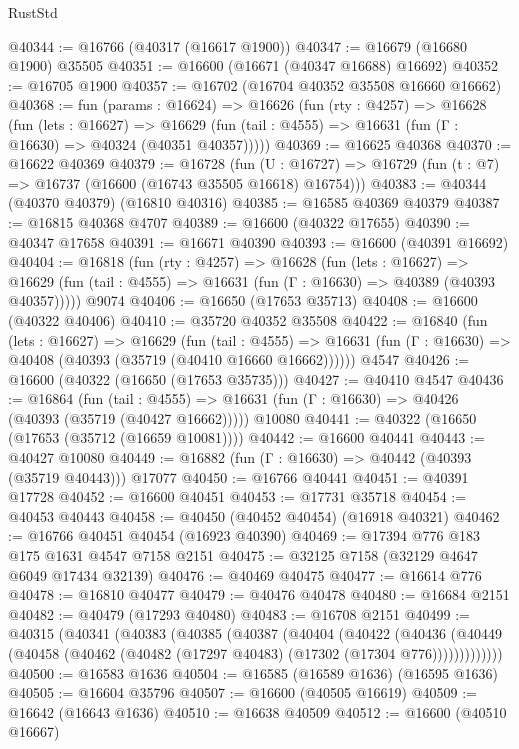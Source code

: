 \begin{lexlean}{RustStd}
\begin{coremodule}
@40344 := @16766 (@40317 (@16617 @1900))
@40347 := @16679 (@16680 @1900) @35505
@40351 := @16600 (@16671 (@40347 @16688) @16692)
@40352 := @16705 @1900
@40357 := @16702 (@16704 @40352 @35508 @16660 @16662)
@40368 := fun (params : @16624) =>
  @16626
    (fun (rty : @4257) =>
    @16628
      (fun (lets : @16627) =>
      @16629 (fun (tail : @4555) => @16631 (fun (Γ : @16630) => @40324 (@40351 @40357)))))
@40369 := @16625 @40368
@40370 := @16622 @40369
@40379 := @16728
    (fun (U : @16727) => @16729 (fun (t : @7) => @16737 (@16600 (@16743 @35505 @16618) @16754)))
@40383 := @40344 (@40370 @40379) (@16810 @40316)
@40385 := @16585 @40369 @40379
@40387 := @16815 @40368 @4707
@40389 := @16600 (@40322 @17655)
@40390 := @40347 @17658
@40391 := @16671 @40390
@40393 := @16600 (@40391 @16692)
@40404 := @16818
    (fun (rty : @4257) =>
    @16628
      (fun (lets : @16627) =>
      @16629 (fun (tail : @4555) => @16631 (fun (Γ : @16630) => @40389 (@40393 @40357)))))
    @9074
@40406 := @16650 (@17653 @35713)
@40408 := @16600 (@40322 @40406)
@40410 := @35720 @40352 @35508
@40422 := @16840
    (fun (lets : @16627) =>
    @16629
      (fun (tail : @4555) =>
      @16631 (fun (Γ : @16630) => @40408 (@40393 (@35719 (@40410 @16660 @16662))))))
    @4547
@40426 := @16600 (@40322 (@16650 (@17653 @35735)))
@40427 := @40410 @4547
@40436 := @16864
    (fun (tail : @4555) => @16631 (fun (Γ : @16630) => @40426 (@40393 (@35719 (@40427 @16662)))))
    @10080
@40441 := @40322 (@16650 (@17653 (@35712 (@16659 @10081))))
@40442 := @16600 @40441
@40443 := @40427 @10080
@40449 := @16882 (fun (Γ : @16630) => @40442 (@40393 (@35719 @40443))) @17077
@40450 := @16766 @40441
@40451 := @40391 @17728
@40452 := @16600 @40451
@40453 := @17731 @35718
@40454 := @40453 @40443
@40458 := @40450 (@40452 @40454) (@16918 @40321)
@40462 := @16766 @40451 @40454 (@16923 @40390)
@40469 := @17394 @776 @183 @175 @1631 @4547 @7158 @2151
@40475 := @32125 @7158 (@32129 @4647 @6049 @17434 @32139)
@40476 := @40469 @40475
@40477 := @16614 @776
@40478 := @16810 @40477
@40479 := @40476 @40478
@40480 := @16684 @2151
@40482 := @40479 (@17293 @40480)
@40483 := @16708 @2151
@40499 := @40315
    (@40341
      (@40383
        (@40385
          (@40387
            (@40404
              (@40422
                (@40436
                  (@40449 (@40458 (@40462 (@40482 (@17297 @40483) (@17302 (@17304 @776)))))))))))))
@40500 := @16583 @1636
@40504 := @16585 (@16589 @1636) (@16595 @1636)
@40505 := @16604 @35796
@40507 := @16600 (@40505 @16619)
@40509 := @16642 (@16643 @1636)
@40510 := @16638 @40509
@40512 := @16600 (@40510 @16667)

\end{coremodule}
\end{lexlean}
